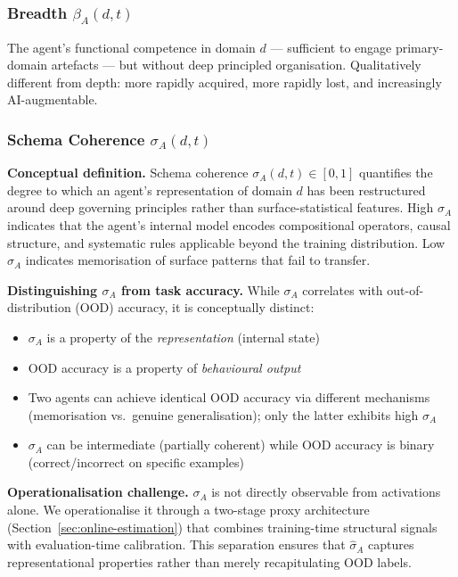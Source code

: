\documentclass[11pt,a4paper]{article}
\begin{document}
\subsubsection{Breadth \texorpdfstring{$\beta_A(d,t)$}{beta\_A(d,t)}}\label{sec:breadth}

The agent's functional competence in domain $d$ --- sufficient to
engage primary-domain artefacts --- but without deep principled
organisation. Qualitatively different from depth: more rapidly acquired,
more rapidly lost, and increasingly AI-augmentable.

\subsubsection{Schema Coherence \texorpdfstring{$\sigma_A(d,t)$}{sigma\_A(d,t)}}\label{sec:schema-coherence}

\textbf{Conceptual definition.} Schema coherence $\sigma_A(d,t) \in [0,1]$
quantifies the degree to which an agent's representation of domain $d$
has been restructured around deep governing principles rather than
surface-statistical features. High $\sigma_A$ indicates that the agent's
internal model encodes compositional operators, causal structure, and
systematic rules applicable beyond the training distribution. Low
$\sigma_A$ indicates memorisation of surface patterns that fail to
transfer.

\textbf{Distinguishing $\sigma_A$ from task accuracy.} While $\sigma_A$
correlates with out-of-distribution (OOD) accuracy, it is conceptually
distinct:
\begin{itemize}[nosep]
\item $\sigma_A$ is a property of the \textit{representation} (internal state)
\item OOD accuracy is a property of \textit{behavioural output}
\item Two agents can achieve identical OOD accuracy via different mechanisms (memorisation vs.\ genuine generalisation); only the latter exhibits high $\sigma_A$
\item $\sigma_A$ can be intermediate (partially coherent) while OOD accuracy is binary (correct/incorrect on specific examples)
\end{itemize}

\textbf{Operationalisation challenge.} $\sigma_A$ is not directly
observable from activations alone. We operationalise it through a
two-stage proxy architecture (Section~\ref{sec:online-estimation}) that
combines training-time structural signals with evaluation-time
calibration. This separation ensures that $\hat{\sigma}_A$ captures
representational properties rather than merely recapitulating OOD labels.
\end{document}
